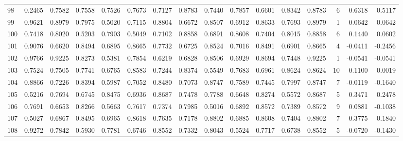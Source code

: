 \begin{tabular}{lrrrrrrrrrrrrrrr}
98  &      0.2465 &  0.7582 &  0.7558 &  0.7526 &  0.7673 &  0.7127 &  0.8783 &  0.7440 &  0.7857 &  0.6601 &   0.8342 &     0.8783 &      6 &                    0.6318 &                     0.5117 \\
99  &      0.9621 &  0.8979 &  0.7975 &  0.5020 &  0.7115 &  0.8804 &  0.6672 &  0.8507 &  0.6912 &  0.8633 &   0.7693 &     0.8979 &      1 &                   -0.0642 &                    -0.0642 \\
100 &      0.7418 &  0.8020 &  0.5203 &  0.7903 &  0.5049 &  0.7102 &  0.8858 &  0.6891 &  0.8608 &  0.7404 &   0.8015 &     0.8858 &      6 &                    0.1440 &                     0.0602 \\
101 &      0.9076 &  0.6620 &  0.8494 &  0.6895 &  0.8665 &  0.7732 &  0.6725 &  0.8524 &  0.7016 &  0.8491 &   0.6901 &     0.8665 &      4 &                   -0.0411 &                    -0.2456 \\
102 &      0.9766 &  0.9225 &  0.8273 &  0.5381 &  0.7854 &  0.6219 &  0.6828 &  0.8506 &  0.6929 &  0.8694 &   0.7448 &     0.9225 &      1 &                   -0.0541 &                    -0.0541 \\
103 &      0.7524 &  0.7505 &  0.7741 &  0.6765 &  0.8583 &  0.7244 &  0.8374 &  0.5549 &  0.7683 &  0.6961 &   0.8624 &     0.8624 &     10 &                    0.1100 &                    -0.0019 \\
104 &      0.8866 &  0.7226 &  0.8394 &  0.5987 &  0.7052 &  0.8480 &  0.7073 &  0.8747 &  0.7589 &  0.7445 &   0.7997 &     0.8747 &      7 &                   -0.0119 &                    -0.1640 \\
105 &      0.5216 &  0.7694 &  0.6745 &  0.8475 &  0.6936 &  0.8687 &  0.7478 &  0.7788 &  0.6648 &  0.8274 &   0.5572 &     0.8687 &      5 &                    0.3471 &                     0.2478 \\
106 &      0.7691 &  0.6653 &  0.8266 &  0.5663 &  0.7617 &  0.7374 &  0.7985 &  0.5016 &  0.6892 &  0.8572 &   0.7389 &     0.8572 &      9 &                    0.0881 &                    -0.1038 \\
107 &      0.5027 &  0.6867 &  0.8495 &  0.6965 &  0.8618 &  0.7635 &  0.7178 &  0.8802 &  0.6885 &  0.8608 &   0.7404 &     0.8802 &      7 &                    0.3775 &                     0.1840 \\
108 &      0.9272 &  0.7842 &  0.5930 &  0.7781 &  0.6746 &  0.8552 &  0.7332 &  0.8043 &  0.5524 &  0.7717 &   0.6738 &     0.8552 &      5 &                   -0.0720 &                    -0.1430 \\

\end{tabular}
